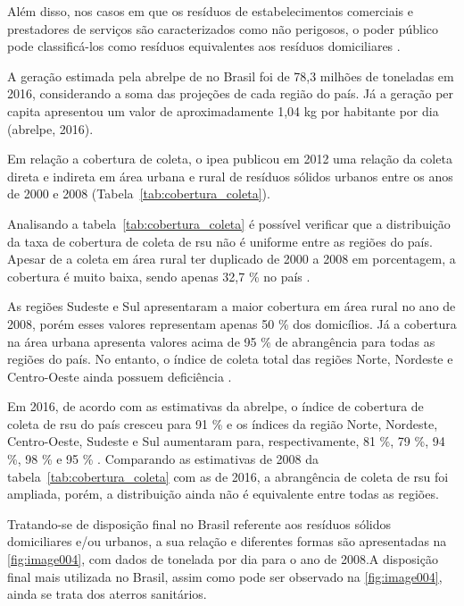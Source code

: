 	Além disso, nos casos em que os resíduos de estabelecimentos comerciais e prestadores de serviços são caracterizados como não perigosos, o poder público pode classificá-los como resíduos equivalentes aos resíduos domiciliares \cite{brasil:12305}.
	
	A geração estimada pela \gls{abrelpe} de  no Brasil foi de 78,3 milhões de toneladas em 2016, considerando a soma das projeções de cada região do país. Já a geração per capita apresentou um valor de aproximadamente 1,04 kg por habitante por dia (\gls{abrelpe}, 2016).
	
	Em relação a cobertura de coleta, o \gls{ipea} publicou em 2012 uma relação da coleta direta e indireta em área urbana e rural de resíduos sólidos urbanos entre os anos de 2000 e 2008 (Tabela~\ref{tab:cobertura_coleta}).
	
	
	
	Analisando a tabela~\ref{tab:cobertura_coleta} é possível verificar que a distribuição da taxa de cobertura de coleta de \gls{rsu} não é uniforme entre as regiões do país. Apesar de a coleta em área rural ter duplicado de 2000 a 2008 em porcentagem, a cobertura é muito baixa, sendo apenas 32,7 \% no país \cite{IPEARSU2012}.
	
	As regiões Sudeste e Sul apresentaram a maior cobertura em área rural no ano de 2008, porém esses valores representam apenas 50 \% dos domicílios. Já a cobertura na área urbana apresenta valores acima de 95 \% de abrangência para todas as regiões do país. No entanto, o índice de coleta total das regiões Norte, Nordeste e Centro-Oeste ainda possuem deficiência \cite{IPEARSU2012}.
	
	Em 2016, de acordo com as estimativas da \gls{abrelpe}, o índice de cobertura de coleta de \gls{rsu} do país cresceu para 91 \% e os índices da região Norte, Nordeste, Centro-Oeste, Sudeste e Sul aumentaram para, respectivamente, 81 \%, 79 \%, 94 \%, 98 \% e 95 \% \cite{abrelpe:2016}. Comparando as estimativas de 2008 da tabela~\ref{tab:cobertura_coleta} com as de 2016, a abrangência de coleta de \gls{rsu} foi ampliada, porém, a distribuição ainda não é equivalente entre todas as regiões.
	
	Tratando-se de disposição final no Brasil referente aos resíduos sólidos domiciliares e/ou urbanos, a sua relação e diferentes formas são apresentadas na \autoref{fig:image004}, com dados de tonelada por dia para o ano de 2008.A disposição final mais utilizada no Brasil, assim como pode ser observado na \autoref{fig:image004}, ainda se trata dos aterros sanitários. 

